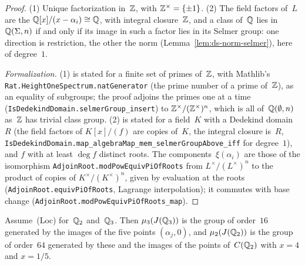 \begin{proof}
\leanok
{}
(1) Unique factorization in~$\mathbb{Z}$, with $\mathbb{Z}^\times = \{\pm 1\}$. (2) The field factors of~$L$ are
the $\mathbb{Q}[x]/(x - \alpha_i) \cong \mathbb{Q}$, with integral closure~$\mathbb{Z}$, and a class of~$\mathbb{Q}$ lies
in~$\mathbb{Q}(\Sigma, n)$ if and only if its image in such a factor lies in its Selmer group: one
direction is restriction, the other the norm (Lemma~\ref{lem:ds-norm-selmer}), here of degree~$1$.

\emph{Formalization.} (1) is stated for a finite set of primes of~$\mathbb{Z}$, with Mathlib's
\texttt{Rat.HeightOneSpectrum.natGenerator} (the prime number of a prime of~$\mathbb{Z}$), as an equality
of subgroups; the proof adjoins the primes one at a time
(\texttt{IsDedekindDomain.selmerGroup\_insert}) to $\mathbb{Z}^\times/(\mathbb{Z}^\times)^n$, which is all
of~$\mathbb{Q}(\emptyset, n)$ as~$\mathbb{Z}$ has trivial class group. (2) is stated for a field~$K$ with a
Dedekind domain~$R$ (the field factors of $K[x]/(f)$ are copies of~$K$, the integral closure
is~$R$, \texttt{IsDedekindDomain.map\_algebraMap\_mem\_selmerGroupAbove\_iff} for degree~$1$), and
$f$ with at least $\deg f$ distinct roots. The components~$\xi(\alpha_i)$ are those of the
isomorphism \texttt{AdjoinRoot.modPowEquivPiOfRoots} from $L^\times/(L^\times)^n$ to the product
of copies of $K^\times/(K^\times)^n$, given by evaluation at the roots
(\texttt{AdjoinRoot.equivPiOfRoots}, Lagrange interpolation); it commutes with base change
(\texttt{AdjoinRoot.modPowEquivPiOfRoots\_map}).
\end{proof}

\begin{lemma}
\label{lem:ds-e1-local}
\leanok
{}
Assume~(Loc) for~$\mathbb{Q}_2$ and~$\mathbb{Q}_3$. Then $\mu_3(J(\mathbb{Q}_3))$ is the group of order~$16$ generated
by the images of the five points $(\alpha_j, 0)$, and $\mu_2(J(\mathbb{Q}_2))$ is the group of order~$64$
generated by these and the images of the points of~$C(\mathbb{Q}_2)$ with $x = 4$ and $x = 1/5$.
\end{lemma}

